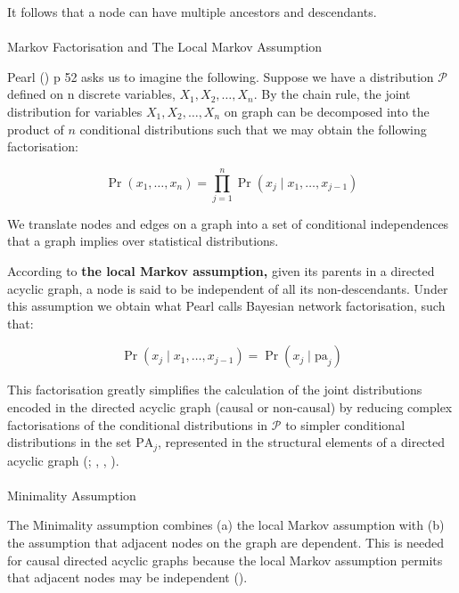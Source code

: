\documentclass[
  single column]{article}
\makeatletter
\let\oldparagraph\paragraph
\renewcommand{\paragraph}{
    \@ifstar
      \xxxParagraphStar
      \xxxParagraphNoStar
  }
\newcommand{\xxxParagraphStar}[1]{\oldparagraph*{#1}\mbox{}}
\newcommand{\xxxParagraphNoStar}[1]{\oldparagraph{#1}\mbox{}}
\makeatother
\begin{document}
It follows that a node can have multiple ancestors and descendants.

\paragraph{Markov Factorisation and The Local Markov
Assumption}\label{markov-factorisation-and-the-local-markov-assumption}

Pearl () p 52 asks us to imagine the
following. Suppose we have a distribution \(\mathcal{P}\) defined on n
discrete variables, \(X_1, X_2,  \dots, X_n\). By the chain rule, the
joint distribution for variables \(X_1, X_2, \dots, X_n\) on graph can
be decomposed into the product of \(n\) conditional distributions such
that we may obtain the following factorisation:

\[
\Pr(x_1, \dots, x_n) = \prod_{j=1}^n \Pr(x_j \mid x_1, \dots, x_{j-1})
\]

We translate nodes and edges on a graph into a set of conditional
independences that a graph implies over statistical distributions.

According to \textbf{the local Markov assumption,} given its parents in
a directed acyclic graph, a node is said to be independent of all its
non-descendants. Under this assumption we obtain what Pearl calls
Bayesian network factorisation, such that:

\[
\Pr(x_j \mid x_1, \dots, x_{j-1}) = \Pr(x_j \mid \text{pa}_j)
\]

This factorisation greatly simplifies the calculation of the joint
distributions encoded in the directed acyclic graph (causal or
non-causal) by reducing complex factorisations of the conditional
distributions in \(\mathcal{P}\) to simpler conditional distributions in
the set \(\text{PA}_j\), represented in the structural elements of a
directed acyclic graph (; ,
, ).

\paragraph{Minimality Assumption}\label{minimality-assumption}

The Minimality assumption combines (a) the local Markov assumption with
(b) the assumption that adjacent nodes on the graph are dependent. This
is needed for causal directed acyclic graphs because the local Markov
assumption permits that adjacent nodes may be independent
().
\end{document}

